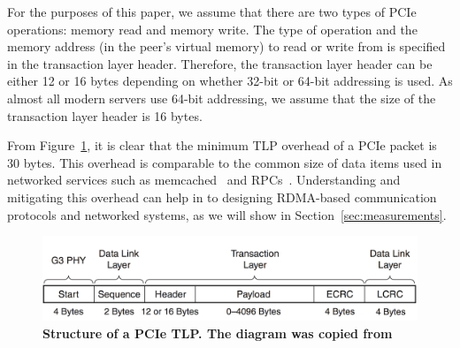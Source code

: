 For the purposes of this paper, we assume that there are two types of PCIe
operations: memory read and memory write. The type of operation and the memory
address (in the peer's virtual memory) to read or write from is specified
in the transaction layer header. Therefore,  the transaction layer
header can be either 12 or 16 bytes depending on whether 32-bit or 64-bit
addressing is used.  As almost all modern servers use 64-bit addressing, we
assume that the size of the transaction layer header is 16 bytes.

From Figure~\ref{fig:pcie-tlp}, it is clear that the minimum TLP overhead of
a PCIe packet is 30 bytes. This overhead is comparable to the common size of
data items used in networked services such as memcached~\cite{Nishtala:nsdi2013}
and RPCs~\cite{Flajslik:usenix2013}. Understanding and mitigating this overhead
can help in to designing RDMA-based communication protocols and networked
systems, as we will show in Section~\ref{sec:measurements}.

\begin{figure}
	\centering
	\includegraphics[width=.48\textwidth]{figures/pcie-tlp.png}
	\caption{\textbf{Structure of a PCIe TLP. The diagram was copied from~\cite{www-xilinx-pcie}}}
	\label{fig:pcie-tlp}
\end{figure}


